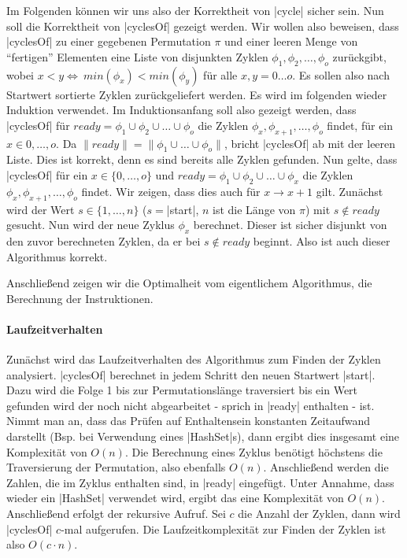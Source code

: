 Im Folgenden können wir uns also der Korrektheit von |cycle| sicher sein. Nun soll die Korrektheit von |cyclesOf| gezeigt werden.
Wir wollen also beweisen, dass |cyclesOf| zu einer gegebenen Permutation $\pi$ und einer leeren Menge von ``fertigen'' Elementen eine Liste
von disjunkten Zyklen $\phi_1, \phi_2, \dots, \phi_o$ zurückgibt, wobei $x < y \Leftrightarrow \ min(\phi_x) < min(\phi_y)$ für alle $x,y=0 \dots o$.
Es sollen also nach Startwert sortierte Zyklen zurückgeliefert werden.
Es wird im folgenden wieder Induktion verwendet.
Im Induktionsanfang soll also gezeigt werden, dass |cyclesOf| für $ready = \phi_1 \cup \phi_2 \cup \dots \cup \phi_o$ die Zyklen $\phi_x, \phi_{x+1}, \dots, \phi_o$ findet, für ein $x \in {0, \dots, o}$.
Da $\|ready\| = \|\phi_1 \cup \dots \cup \phi_o\|$, bricht |cyclesOf| ab mit der leeren Liste. Dies ist korrekt, denn es sind bereits alle Zyklen gefunden.
Nun gelte, dass |cyclesOf| für ein $x \in \{0, \dots, o\}$ und $ready = \phi_1 \cup \phi_2 \cup \dots \cup \phi_x$ die Zyklen $\phi_x, \phi_{x+1}, \dots, \phi_o$ findet.
Wir zeigen, dass dies auch für $x \rightarrow x+1$ gilt.
Zunächst wird der Wert $s \in \{1, \dots, n\}$ ($s=$|start|, $n$ ist die Länge von $\pi$) mit $s \notin ready$ gesucht.
Nun wird der neue Zyklus $\phi_x$ berechnet. Dieser ist sicher disjunkt von den zuvor berechneten Zyklen, da er bei $s \notin ready$ beginnt.
Also ist auch dieser Algorithmus korrekt.

Anschließend zeigen wir die Optimalheit vom eigentlichem Algorithmus, die Berechnung der Instruktionen.

\paragraph{Laufzeitverhalten}
Zunächst wird das Laufzeitverhalten des Algorithmus zum Finden der Zyklen analysiert.
|cyclesOf| berechnet in jedem Schritt den neuen Startwert |start|.
Dazu wird die Folge 1 bis zur Permutationslänge traversiert bis ein Wert gefunden wird der noch nicht abgearbeitet - sprich in |ready| enthalten - ist.
Nimmt man an, dass das Prüfen auf Enthaltensein konstanten Zeitaufwand darstellt (Bsp. bei Verwendung eines |HashSet|s), dann ergibt dies insgesamt eine Komplexität von $O(n)$.
Die Berechnung eines Zyklus benötigt höchstens die Traversierung der Permutation, also ebenfalls $O(n)$. %
Anschließend werden die Zahlen, die im Zyklus enthalten sind, in |ready| eingefügt. Unter Annahme, dass wieder ein |HashSet| verwendet wird, ergibt das eine Komplexität von $O(n)$.
Anschließend erfolgt der rekursive Aufruf. Sei $c$ die Anzahl der Zyklen, dann wird |cyclesOf| $c$-mal aufgerufen.
Die Laufzeitkomplexität zur Finden der Zyklen ist also $O(c \cdot n)$. \\

